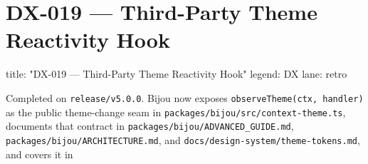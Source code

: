\chapter{DX-019 --- Third-Party Theme Reactivity Hook}\label{record-330}

\smallskip

\begin{RecordMeta}
title: "DX-019 — Third-Party Theme Reactivity Hook"
legend: DX
lane: retro

\end{RecordMeta}

Completed on \texttt{r\allowbreak{}e\allowbreak{}l\allowbreak{}e\allowbreak{}a\allowbreak{}s\allowbreak{}e\allowbreak{}/\allowbreak{}v\allowbreak{}5\allowbreak{}.\allowbreak{}0\allowbreak{}.\allowbreak{}0}. Bijou now exposes \texttt{o\allowbreak{}b\allowbreak{}s\allowbreak{}e\allowbreak{}r\allowbreak{}v\allowbreak{}e\allowbreak{}T\allowbreak{}h\allowbreak{}e\allowbreak{}m\allowbreak{}e\allowbreak{}(\allowbreak{}c\allowbreak{}t\allowbreak{}x\allowbreak{},\allowbreak{} \allowbreak{}h\allowbreak{}a\allowbreak{}n\allowbreak{}d\allowbreak{}l\allowbreak{}e\allowbreak{}r\allowbreak{})} as the public theme-change seam in \texttt{p\allowbreak{}a\allowbreak{}c\allowbreak{}k\allowbreak{}a\allowbreak{}g\allowbreak{}e\allowbreak{}s\allowbreak{}/\allowbreak{}b\allowbreak{}i\allowbreak{}j\allowbreak{}o\allowbreak{}u\allowbreak{}/\allowbreak{}s\allowbreak{}r\allowbreak{}c\allowbreak{}/\allowbreak{}c\allowbreak{}o\allowbreak{}n\allowbreak{}t\allowbreak{}e\allowbreak{}x\allowbreak{}t\allowbreak{}-\allowbreak{}t\allowbreak{}h\allowbreak{}e\allowbreak{}m\allowbreak{}e\allowbreak{}.\allowbreak{}t\allowbreak{}s}, documents that contract in \texttt{p\allowbreak{}a\allowbreak{}c\allowbreak{}k\allowbreak{}a\allowbreak{}g\allowbreak{}e\allowbreak{}s\allowbreak{}/\allowbreak{}b\allowbreak{}i\allowbreak{}j\allowbreak{}o\allowbreak{}u\allowbreak{}/\allowbreak{}A\allowbreak{}D\allowbreak{}V\allowbreak{}A\allowbreak{}N\allowbreak{}C\allowbreak{}E\allowbreak{}D\allowbreak{}\_\allowbreak{}G\allowbreak{}U\allowbreak{}I\allowbreak{}D\allowbreak{}E\allowbreak{}.\allowbreak{}m\allowbreak{}d}, \texttt{p\allowbreak{}a\allowbreak{}c\allowbreak{}k\allowbreak{}a\allowbreak{}g\allowbreak{}e\allowbreak{}s\allowbreak{}/\allowbreak{}b\allowbreak{}i\allowbreak{}j\allowbreak{}o\allowbreak{}u\allowbreak{}/\allowbreak{}A\allowbreak{}R\allowbreak{}C\allowbreak{}H\allowbreak{}I\allowbreak{}T\allowbreak{}E\allowbreak{}C\allowbreak{}T\allowbreak{}U\allowbreak{}R\allowbreak{}E\allowbreak{}.\allowbreak{}m\allowbreak{}d}, and \texttt{d\allowbreak{}o\allowbreak{}c\allowbreak{}s\allowbreak{}/\allowbreak{}d\allowbreak{}e\allowbreak{}s\allowbreak{}i\allowbreak{}g\allowbreak{}n\allowbreak{}-\allowbreak{}s\allowbreak{}y\allowbreak{}s\allowbreak{}t\allowbreak{}e\allowbreak{}m\allowbreak{}/\allowbreak{}t\allowbreak{}h\allowbreak{}e\allowbreak{}m\allowbreak{}e\allowbreak{}-\allowbreak{}t\allowbreak{}o\allowbreak{}k\allowbreak{}e\allowbreak{}n\allowbreak{}s\allowbreak{}.\allowbreak{}m\allowbreak{}d}, and covers it in 